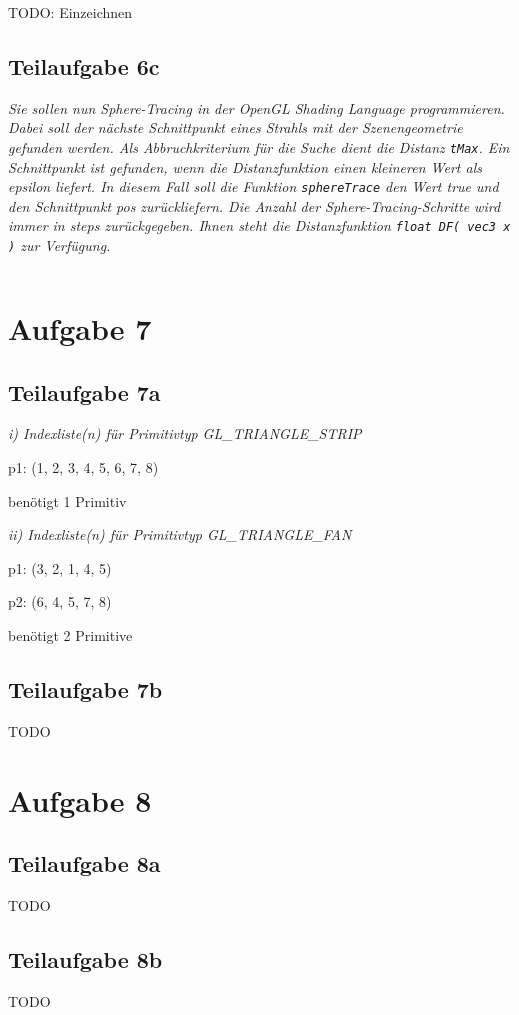 \documentclass[a4paper]{scrartcl}
\begin{document}
TODO: Einzeichnen

\clearpage
\subsection*{Teilaufgabe 6c}
\textit{Sie sollen nun Sphere-Tracing in der OpenGL Shading Language
programmieren. Dabei soll der nächste Schnittpunkt eines Strahls mit der
Szenengeometrie gefunden werden. Als Abbruchkriterium für die Suche dient die
Distanz \texttt{tMax}. Ein Schnittpunkt ist gefunden, wenn die Distanzfunktion
einen kleineren Wert als epsilon liefert. In diesem Fall soll die Funktion
\texttt{sphereTrace} den Wert true und den Schnittpunkt pos zurückliefern. Die
Anzahl der Sphere-Tracing-Schritte wird immer in steps zurückgegeben. Ihnen
steht die Distanzfunktion \texttt{float DF( vec3 x )} zur Verfügung.}

\inputminted[linenos, numbersep=5pt, tabsize=4, frame=lines, label=spheretracing.frag]{glsl}{spheretracing.frag}

\clearpage
\section*{Aufgabe 7}
\subsection*{Teilaufgabe 7a}
\textit{i) Indexliste(n) für Primitivtyp GL_TRIANGLE_STRIP}

p1: (1, 2, 3, 4, 5, 6, 7, 8)

benötigt 1 Primitiv


\textit{ii) Indexliste(n) für Primitivtyp GL_TRIANGLE_FAN}

p1: (3, 2, 1, 4, 5)

p2: (6, 4, 5, 7, 8)

benötigt 2 Primitive


\subsection*{Teilaufgabe 7b}
TODO

\section*{Aufgabe 8}
\subsection*{Teilaufgabe 8a}
TODO
\subsection*{Teilaufgabe 8b}
TODO
\end{document}
